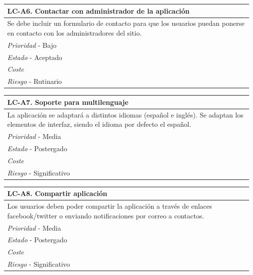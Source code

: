 	\begin{center}
		\begin{tabularx}{15cm}{|X|}
			\hline 
				\bf{LC-A6. Contactar con administrador de la aplicación}\\
			\hline
				Se debe incluir un formulario de contacto para que los usuarios puedan ponerse en contacto con los administradores del sitio.\\
			\hline
				{\it Prioridad} - Bajo\\
			\hline
				{\it Estado} - Aceptado\\
			\hline
				{\it Coste}\\
			\hline
				{\it Riesgo} - Rutinario\\
			\hline
		\end{tabularx}
	\end{center}
	
	\begin{center}
		\begin{tabularx}{15cm}{|X|}
			\hline 
				\bf{LC-A7. Soporte para multilenguaje}\\
			\hline
				La aplicación se adaptará a distintos idiomas (español e inglés). Se adaptan los elementos de interfaz, siendo el idioma por defecto el español.\\
			\hline
				{\it Prioridad} - Media\\
			\hline
				{\it Estado} - Postergado\\
			\hline
				{\it Coste}\\
			\hline
				{\it Riesgo} - Significativo\\
			\hline
		\end{tabularx}
	\end{center}
	
	\begin{center}
		\begin{tabularx}{15cm}{|X|}
			\hline 
				\bf{LC-A8. Compartir aplicación}\\
			\hline
				Los usuarios deben poder compartir la aplicación a través de enlaces facebook/twitter o enviando notificaciones por correo a contactos.\\
			\hline
				{\it Prioridad} - Media\\
			\hline
				{\it Estado} - Postergado\\
			\hline
				{\it Coste}\\
			\hline
				{\it Riesgo} - Significativo\\
			\hline
		\end{tabularx}
	\end{center}
	
